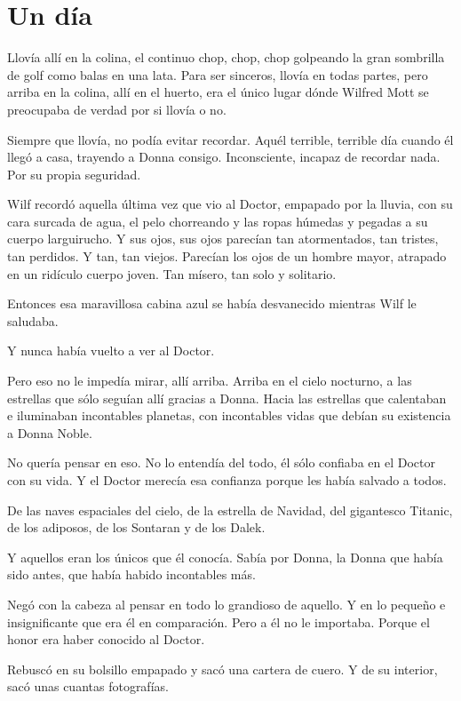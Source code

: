 \chapter*{Un día}

Llovía allí en la colina, el continuo chop, chop, chop golpeando la gran
sombrilla de golf como balas en una lata. Para ser sinceros, llovía en
todas partes, pero arriba en la colina, allí en el huerto, era el único
lugar dónde Wilfred Mott se preocupaba de verdad por si llovía o no.

Siempre que llovía, no podía evitar recordar. Aquél terrible, terrible
día cuando él llegó a casa, trayendo a Donna consigo. Inconsciente,
incapaz de recordar nada. Por su propia seguridad.

Wilf recordó aquella última vez que vio al Doctor, empapado por la
lluvia, con su cara surcada de agua, el pelo chorreando y las ropas
húmedas y pegadas a su cuerpo larguirucho. Y sus ojos, sus ojos parecían
tan atormentados, tan tristes, tan perdidos. Y tan, tan viejos. Parecían
los ojos de un hombre mayor, atrapado en un ridículo cuerpo joven. Tan
mísero, tan solo y solitario.

Entonces esa maravillosa cabina azul se había desvanecido mientras Wilf
le saludaba.

Y nunca había vuelto a ver al Doctor.

Pero eso no le impedía mirar, allí arriba. Arriba en el cielo nocturno,
a las estrellas que sólo seguían allí gracias a Donna. Hacia las
estrellas que calentaban e iluminaban incontables planetas, con
incontables vidas que debían su existencia a Donna Noble.

No quería pensar en eso. No lo entendía del todo, él sólo confiaba en el
Doctor con su vida. Y el Doctor merecía esa confianza porque les había
salvado a todos.

De las naves espaciales del cielo, de la estrella de Navidad, del
gigantesco Titanic, de los adiposos, de los Sontaran y de los Dalek.

Y aquellos eran los únicos que él conocía. Sabía por Donna, la Donna que
había sido antes, que había habido incontables más.

Negó con la cabeza al pensar en todo lo grandioso de aquello. Y en lo
pequeño e insignificante que era él en comparación. Pero a él no le
importaba. Porque el honor era haber conocido al Doctor.

Rebuscó en su bolsillo empapado y sacó una cartera de cuero. Y de su
interior, sacó unas cuantas fotografías.

